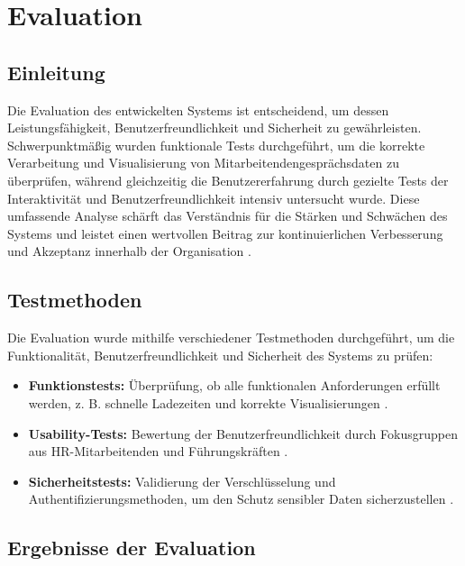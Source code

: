 \chapter{Evaluation}
\label{chap:evaluation}

\section{Einleitung}
Die Evaluation des entwickelten Systems ist entscheidend, um dessen Leistungsf\"ahigkeit, Benutzerfreundlichkeit und Sicherheit zu gew\"ahrleisten. Schwerpunktm\"a\ss ig wurden funktionale Tests durchgef\"uhrt, um die korrekte Verarbeitung und Visualisierung von Mitarbeitendengespr\"achs\-daten zu \"uberpr\"ufen, w\"ahrend gleichzeitig die Benutzererfahrung durch gezielte Tests der Interaktivit\"at und Benutzerfreundlichkeit intensiv untersucht wurde. Diese umfassende Analyse sch\"arft das Verst\"andnis f\"ur die St\"arken und Schw\"achen des Systems und leistet einen wertvollen Beitrag zur kontinuierlichen Verbesserung und Akzeptanz innerhalb der Organisation \cite{akinnuwesi2012framework, achter2016bigdata, angrave2016hr}.

\section{Testmethoden}
Die Evaluation wurde mithilfe verschiedener Testmethoden durchgef\"uhrt, um die Funktionalit\"at, Benutzerfreundlichkeit und Sicherheit des Systems zu pr\"ufen:
\begin{itemize}
    \item \textbf{Funktionstests:} \"Uberpr\"ufung, ob alle funktionalen Anforderungen erf\"ullt werden, z. B. schnelle Ladezeiten und korrekte Visualisierungen \cite{kirk2019datavisualisation}.
    \item \textbf{Usability-Tests:} Bewertung der Benutzerfreundlichkeit durch Fokusgruppen aus HR-Mitarbeitenden und F\"uhrungskr\"aften \cite{heikkila2018quantified}.
    \item \textbf{Sicherheitstests:} Validierung der Verschl\"usselung und Authentifizierungsmethoden, um den Schutz sensibler Daten sicherzustellen \cite{van2011employee}.
\end{itemize}

\section{Ergebnisse der Evaluation}
